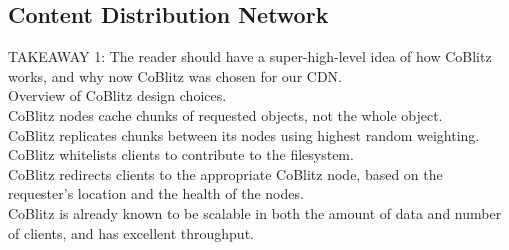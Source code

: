 {\subsection{Content Distribution Network}
TAKEAWAY 1: The reader should have a super-high-level idea of how CoBlitz works, and why now CoBlitz was chosen for our CDN.
\\
Overview of CoBlitz design choices.
\\
CoBlitz nodes cache chunks of requested objects, not the whole object.
\\
CoBlitz replicates chunks between its nodes using highest random weighting.
\\
CoBlitz whitelists clients to contribute to the filesystem.
\\
CoBlitz redirects clients to the appropriate CoBlitz node, based on the requester's location and the health of the nodes.
\\
CoBlitz is already known to be scalable in both the amount of data and number of clients, and has excellent throughput. 
\\
}


